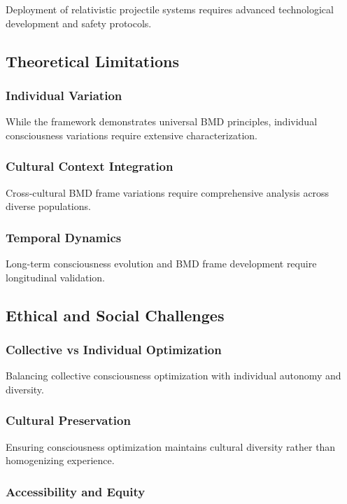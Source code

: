 \documentclass[12pt,a4paper]{article}
\begin{document}
Deployment of relativistic projectile systems requires advanced technological development and safety protocols.

\subsection{Theoretical Limitations}

\subsubsection{Individual Variation}

While the framework demonstrates universal BMD principles, individual consciousness variations require extensive characterization.

\subsubsection{Cultural Context Integration}

Cross-cultural BMD frame variations require comprehensive analysis across diverse populations.

\subsubsection{Temporal Dynamics}

Long-term consciousness evolution and BMD frame development require longitudinal validation.

\subsection{Ethical and Social Challenges}

\subsubsection{Collective vs Individual Optimization}

Balancing collective consciousness optimization with individual autonomy and diversity.

\subsubsection{Cultural Preservation}

Ensuring consciousness optimization maintains cultural diversity rather than homogenizing experience.

\subsubsection{Accessibility and Equity}
\end{document}
